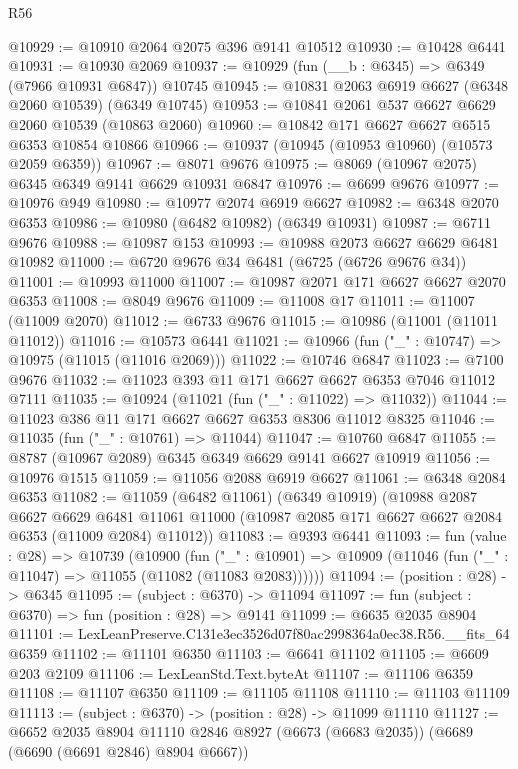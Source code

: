 \begin{lexlean}{R56}
\begin{coremodule}
@10929 := @10910 @2064 @2075 @396 @9141 @10512
@10930 := @10428 @6441
@10931 := @10930 @2069
@10937 := @10929 (fun (__b : @6345) => @6349 (@7966 @10931 @6847)) @10745
@10945 := @10831 @2063 @6919 @6627 (@6348 @2060 @10539) (@6349 @10745)
@10953 := @10841 @2061 @537 @6627 @6629 @2060 @10539 (@10863 @2060)
@10960 := @10842 @171 @6627 @6627 @6515 @6353 @10854 @10866
@10966 := @10937 (@10945 (@10953 @10960) (@10573 @2059 @6359))
@10967 := @8071 @9676
@10975 := @8069 (@10967 @2075) @6345 @6349 @9141 @6629 @10931 @6847
@10976 := @6699 @9676
@10977 := @10976 @949
@10980 := @10977 @2074 @6919 @6627
@10982 := @6348 @2070 @6353
@10986 := @10980 (@6482 @10982) (@6349 @10931)
@10987 := @6711 @9676
@10988 := @10987 @153
@10993 := @10988 @2073 @6627 @6629 @6481 @10982
@11000 := @6720 @9676 @34 @6481 (@6725 (@6726 @9676 @34))
@11001 := @10993 @11000
@11007 := @10987 @2071 @171 @6627 @6627 @2070 @6353
@11008 := @8049 @9676
@11009 := @11008 @17
@11011 := @11007 (@11009 @2070)
@11012 := @6733 @9676
@11015 := @10986 (@11001 (@11011 @11012))
@11016 := @10573 @6441
@11021 := @10966 (fun ("_" : @10747) => @10975 (@11015 (@11016 @2069)))
@11022 := @10746 @6847
@11023 := @7100 @9676
@11032 := @11023 @393 @11 @171 @6627 @6627 @6353 @7046 @11012 @7111
@11035 := @10924 (@11021 (fun ("_" : @11022) => @11032))
@11044 := @11023 @386 @11 @171 @6627 @6627 @6353 @8306 @11012 @8325
@11046 := @11035 (fun ("_" : @10761) => @11044)
@11047 := @10760 @6847
@11055 := @8787 (@10967 @2089) @6345 @6349 @6629 @9141 @6627 @10919
@11056 := @10976 @1515
@11059 := @11056 @2088 @6919 @6627
@11061 := @6348 @2084 @6353
@11082 := @11059
    (@6482 @11061)
    (@6349 @10919)
    (@10988
      @2087
      @6627
      @6629
      @6481
      @11061
      @11000
      (@10987 @2085 @171 @6627 @6627 @2084 @6353 (@11009 @2084) @11012))
@11083 := @9393 @6441
@11093 := fun (value : @28) =>
  @10739
    (@10900
      (fun ("_" : @10901) =>
      @10909 (@11046 (fun ("_" : @11047) => @11055 (@11082 (@11083 @2083))))))
@11094 := (position : @28) -> @6345
@11095 := (subject : @6370) -> @11094
@11097 := fun (subject : @6370) => fun (position : @28) => @9141
@11099 := @6635 @2035 @8904
@11101 := LexLeanPreserve.C131e3ec3526d07f80ac2998364a0ec38.R56.__fits_64 @6359
@11102 := @11101 @6350
@11103 := @6641 @11102
@11105 := @6609 @203 @2109
@11106 := LexLeanStd.Text.byteAt
@11107 := @11106 @6359
@11108 := @11107 @6350
@11109 := @11105 @11108
@11110 := @11103 @11109
@11113 := (subject : @6370) -> (position : @28) -> @11099 @11110
@11127 := @6652
    @2035
    @8904
    @11110
    @2846
    @8927
    (@6673 (@6683 @2035))
    (@6689 (@6690 (@6691 @2846) @8904 @6667))

\end{coremodule}
\end{lexlean}
